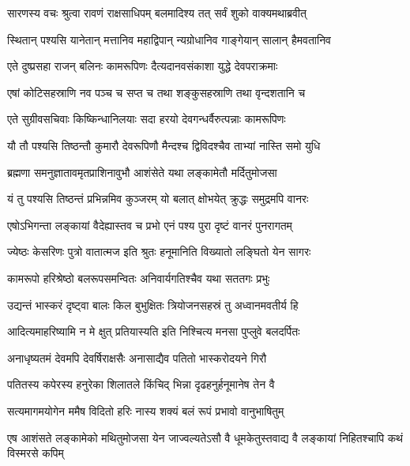 
\twolineshloka
{सारणस्य वचः श्रुत्वा रावणं राक्षसाधिपम्}
{बलमादिश्य तत् सर्वं शुको वाक्यमथाब्रवीत्} %

\twolineshloka
{स्थितान् पश्यसि यानेतान् मत्तानिव महाद्विपान्}
{न्यग्रोधानिव गाङ्गेयान् सालान् हैमवतानिव} %

\twolineshloka
{एते दुष्प्रसहा राजन् बलिनः कामरूपिणः}
{दैत्यदानवसंकाशा युद्धे देवपराक्रमाः} %

\twolineshloka
{एषां कोटिसहस्राणि नव पञ्च च सप्त च}
{तथा शङ्कुसहस्राणि तथा वृन्दशतानि च} %

\twolineshloka
{एते सुग्रीवसचिवाः किष्किन्धानिलयाः सदा}
{हरयो देवगन्धर्वैरुत्पन्नाः कामरूपिणः} %

\twolineshloka
{यौ तौ पश्यसि तिष्ठन्तौ कुमारौ देवरूपिणौ}
{मैन्दश्च द्विविदश्चैव ताभ्यां नास्ति समो युधि} %

\twolineshloka
{ब्रह्मणा समनुज्ञातावमृतप्राशिनावुभौ}
{आशंसेते यथा लङ्कामेतौ मर्दितुमोजसा} %

\twolineshloka
{यं तु पश्यसि तिष्ठन्तं प्रभिन्नमिव कुञ्जरम्}
{यो बलात् क्षोभयेत् क्रुद्धः समुद्रमपि वानरः} %

\twolineshloka
{एषोऽभिगन्ता लङ्कायां वैदेह्यास्तव च प्रभो}
{एनं पश्य पुरा दृष्टं वानरं पुनरागतम्} %

\twolineshloka
{ज्येष्ठः केसरिणः पुत्रो वातात्मज इति श्रुतः}
{हनूमानिति विख्यातो लङ्घितो येन सागरः} %

\twolineshloka
{कामरूपो हरिश्रेष्ठो बलरूपसमन्वितः}
{अनिवार्यगतिश्चैव यथा सततगः प्रभुः} %

\twolineshloka
{उद्यन्तं भास्करं दृष्ट्वा बालः किल बुभुक्षितः}
{त्रियोजनसहस्रं तु अध्वानमवतीर्य हि} %

\twolineshloka
{आदित्यमाहरिष्यामि न मे क्षुत् प्रतियास्यति}
{इति निश्चित्य मनसा पुप्लुवे बलदर्पितः} %

\twolineshloka
{अनाधृष्यतमं देवमपि देवर्षिराक्षसैः}
{अनासाद्यैव पतितो भास्करोदयने गिरौ} %

\twolineshloka
{पतितस्य कपेरस्य हनुरेका शिलातले}
{किंचिद् भिन्ना दृढहनुर्हनूमानेष तेन वै} %

\twolineshloka
{सत्यमागमयोगेन ममैष विदितो हरिः}
{नास्य शक्यं बलं रूपं प्रभावो वानुभाषितुम्} %

\threelineshloka
{एष आशंसते लङ्कामेको मथितुमोजसा}
{येन जाज्वल्यतेऽसौ वै धूमकेतुस्तवाद्य वै}
{लङ्कायां निहितश्चापि कथं विस्मरसे कपिम्} %

